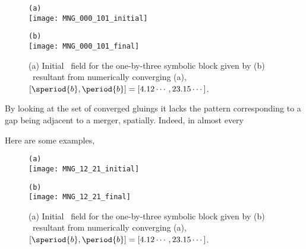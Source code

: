 \begin{figure}
\begin{minipage}[height=.4\textheight]{.5\textwidth}
\centering \small{\texttt{(a)}}\\
\texttt{[image: MNG\_000\_101\_initial]}
\end{minipage}
\begin{minipage}[height=.4\textheight]{.5\textwidth}
\centering \small{\texttt{(b)}}\\
\texttt{[image: MNG\_000\_101\_final]}
\end{minipage}
\caption{ \label{fig:block000_101}
(a) Initial \spt\ field for the one-by-three symbolic block given by 
(b) \twoT\ resultant from numerically converging (a),
$[\speriod{b},\period{b}]=[4.12\cdots,23.15\cdots ]$.
}
\end{figure}

By looking at the set of converged gluings it lacks the pattern corresponding
to a gap being adjacent to a merger, spatially.
Indeed, in almost every

Here are some examples,


\begin{figure}
\begin{minipage}[height=.4\textheight]{.5\textwidth}
\centering \small{\texttt{(a)}}\\
\texttt{[image: MNG\_12\_21\_initial]}
\end{minipage}
\begin{minipage}[height=.4\textheight]{.5\textwidth}
\centering \small{\texttt{(b)}}\\
\texttt{[image: MNG\_12\_21\_final]}
\end{minipage}
\caption{ \label{fig:block12_21}
(a) Initial \spt\ field for the one-by-three symbolic block given by 
(b) \twoT\ resultant from numerically converging (a),
$[\speriod{b},\period{b}]=[4.12\cdots,23.15\cdots ]$.
}
\end{figure}

